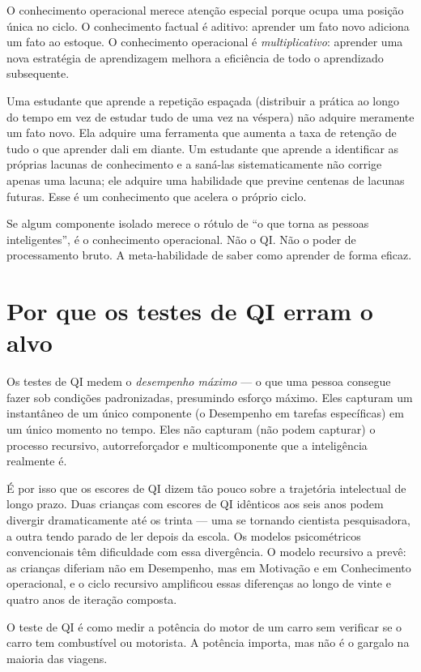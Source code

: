\documentclass[11pt, twoside, openright]{book}
\begin{document}
O conhecimento operacional merece atenção especial porque ocupa uma posição única no ciclo. O conhecimento factual é aditivo: aprender um fato novo adiciona um fato ao estoque. O conhecimento operacional é \textit{multiplicativo}: aprender uma nova estratégia de aprendizagem melhora a eficiência de todo o aprendizado subsequente.

Uma estudante que aprende a repetição espaçada (distribuir a prática ao longo do tempo em vez de estudar tudo de uma vez na véspera) não adquire meramente um fato novo. Ela adquire uma ferramenta que aumenta a taxa de retenção de tudo o que aprender dali em diante. Um estudante que aprende a identificar as próprias lacunas de conhecimento e a saná-las sistematicamente não corrige apenas uma lacuna; ele adquire uma habilidade que previne centenas de lacunas futuras. Esse é um conhecimento que acelera o próprio ciclo.

Se algum componente isolado merece o rótulo de ``o que torna as pessoas inteligentes'', é o conhecimento operacional. Não o QI. Não o poder de processamento bruto. A meta-habilidade de saber como aprender de forma eficaz.

\section*{Por que os testes de QI erram o alvo}

Os testes de QI medem o \textit{desempenho máximo} --- o que uma pessoa consegue fazer sob condições padronizadas, presumindo esforço máximo. Eles capturam um instantâneo de um único componente (o Desempenho em tarefas específicas) em um único momento no tempo. Eles não capturam (não podem capturar) o processo recursivo, autorreforçador e multicomponente que a inteligência realmente é.

É por isso que os escores de QI dizem tão pouco sobre a trajetória intelectual de longo prazo. Duas crianças com escores de QI idênticos aos seis anos podem divergir dramaticamente até os trinta --- uma se tornando cientista pesquisadora, a outra tendo parado de ler depois da escola. Os modelos psicométricos convencionais têm dificuldade com essa divergência. O modelo recursivo a prevê: as crianças diferiam não em Desempenho, mas em Motivação e em Conhecimento operacional, e o ciclo recursivo amplificou essas diferenças ao longo de vinte e quatro anos de iteração composta.

O teste de QI é como medir a potência do motor de um carro sem verificar se o carro tem combustível ou motorista. A potência importa, mas não é o gargalo na maioria das viagens.
\end{document}

